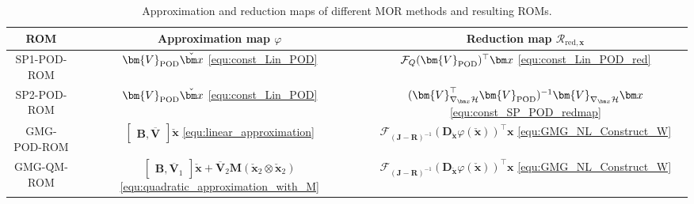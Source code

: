 \documentclass{article}
\newcommand{\bmV}{\bm{V}}
\newcommand{\bmJ}{\bm{J}}
\newcommand{\bmR}{\bm{R}}
\newcommand{\bmB}{\bm{B}}
\newcommand{\bmD}{\bm{D}}
\newcommand{\bmM}{\bm{M}}
\newcommand{\curlyH}{\mathcal{H}}
\newcommand{\statex}{{\bm x}}
\newcommand{\stateRed}{\check{\bm x}}
\newcommand{\approxfunc}{\varphi}
\newcommand{\matfunc}{\mathcal{F}}
\newcommand{\VPOD}{\bmV_{\rm POD}}
\newcommand{\VPODGMG}{\overline{\bmV}}
\newcommand{\VPODQMone}{\overline{\bmV}_{1}}
\newcommand{\VPODQMtwo}{\overline{\bmV}_{2}}
\newcommand{\GMG}{\textsf{GMG}\xspace}
\newcommand{\QM}{\textsf{QM}\xspace} %
\newcommand{\POD}{\textsf{POD}\xspace}
\newcommand{\ROM}{\textsf{ROM}\xspace}
\newcommand{\SPQuad}{\textsf{SP2}\xspace}
\newcommand{\SPLin}{\textsf{SP1}\xspace}
\newcommand\tstrut{\rule{0pt}{2.8ex}}
\begin{document}
\begin{table}[htbp]
\setlength{\tabcolsep}{4pt}
	\begin{center}
		\begin{tabular}{|c|c|c|}
			\hline
			\ROM  & Approximation map  $\approxfunc$ & 
			Reduction map $\mathcal{R}_{\text{red},\statex}$
			\\ 
			\hline
			\SPLin-\POD-\ROM \cite{schulze2023structure} 
			& $\VPOD\stateRed$ 
			\eqref{equ:const_Lin_POD}
			& $\matfunc_{Q}(\VPOD)^{\top}\statex$
			\eqref{equ:const_Lin_POD_red}
			\tstrut 
			\\
			\SPQuad-\POD-\ROM \cite{chaturantabut2016structure} 
			& $ \VPOD\stateRed$ 
			\eqref{equ:const_Lin_POD}
			& $(\bmV_{\nabla_{\statex}\curlyH}^{\top}\VPOD)^{-1}\bmV_{\nabla_{\statex}\curlyH}\statex$
			\eqref{equ:const_SP_POD_redmap}
			\\
			\hline
			\GMG-\POD-\ROM& 
			$
			\begin{bmatrix}
				\bmB,\VPODGMG
			\end{bmatrix}\stateRed$
			\eqref{equ:linear_approximation}
			& $\matfunc_{(\bmJ-\bmR)^{-1}}(\bmD_{\stateRed}\approxfunc(\stateRed))^{\top}\statex$
			\eqref{equ:GMG_NL_Construct_W}
			\tstrut \\
			\GMG-\QM-\ROM & 
			$ 
			\begin{bmatrix}
				\bmB,\VPODQMone
			\end{bmatrix}\stateRed + \VPODQMtwo\bmM(\stateRed_2\otimes\stateRed_2)$ 
			\eqref{equ:quadratic_approximation_with_M}& $\matfunc_{(\bmJ-\bmR)^{-1}}(\bmD_{\stateRed}\approxfunc(\stateRed))^{\top}\statex$
			\eqref{equ:GMG_NL_Construct_W}
			\\
			\hline
		\end{tabular}
		\caption{Approximation and reduction maps of different MOR methods and resulting ROMs.}
		\label{table:proj_bases}
	\end{center}
\end{table}
\end{document}
